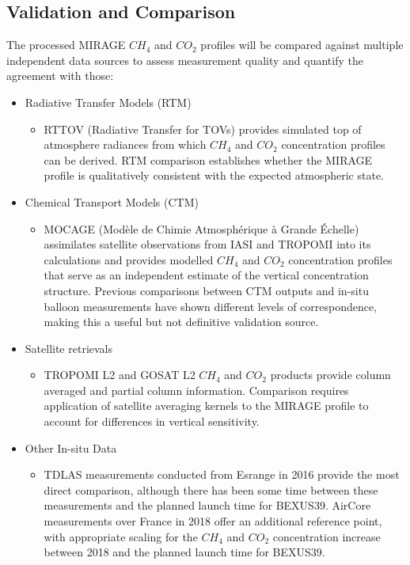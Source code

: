 \subsection*{Validation and Comparison} 
The processed MIRAGE $CH_4$ and $CO_2$ profiles will be compared against multiple independent data sources to assess measurement quality and quantify the agreement with those:
\begin{itemize}
  \item Radiative Transfer Models (RTM)
  \begin{itemize}
    \item RTTOV (Radiative Transfer for TOVs) provides simulated top of atmosphere radiances from which $CH_4$ and $CO_2$ concentration profiles can be derived. RTM comparison establishes whether the MIRAGE profile is qualitatively consistent with the expected atmospheric state.
  \end{itemize}
  \item Chemical Transport Models (CTM)
  \begin{itemize}
    \item MOCAGE (Modèle de Chimie Atmosphérique à Grande Échelle) assimilates satellite observations from IASI and TROPOMI into its calculations and provides modelled $CH_4$ and $CO_2$ concentration profiles that serve as an independent estimate of the vertical concentration structure. Previous comparisons between CTM outputs and in-situ balloon measurements have shown different levels of correspondence, making this a useful but not definitive validation source.
  \end{itemize}
  \item Satellite retrievals
  \begin{itemize}
    \item TROPOMI L2 and GOSAT L2 $CH_4$ and $CO_2$ products provide column averaged and partial column information. Comparison requires application of satellite averaging kernels to the MIRAGE profile to account for differences in vertical sensitivity.
  \end{itemize}
  \item Other In-situ Data 
  \begin{itemize}
    \item TDLAS measurements conducted from Esrange in 2016 \cite{Khair2017} provide the most direct comparison, although there has been some time between these measurements and the planned launch time for BEXUS39. AirCore measurements over France in 2018 \cite{RINGO} offer an additional reference point, with appropriate scaling for the $CH_4$ and $CO_2$ concentration increase between 2018 and the planned launch time for BEXUS39.
  \end{itemize}
\end{itemize} 
 
